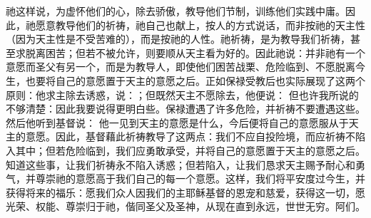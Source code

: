 祂这样说，为虚怀他们的心，除去骄傲，教导他们节制，训练他们实践中庸。因此，祂愿意教导他们的祈祷，祂自己也献上，按人的方式说话，而非按祂的天主性（因为天主性是不受苦难的），而是按祂的人性。祂祈祷，是为教导我们祈祷，甚至求脱离困苦；但若不被允许，则要顺从天主看为好的。因此祂说：并非祂有一个意愿而圣父有另一个，而是为教导人，即使他们困苦战栗、危险临到、不愿脱离今生，也要将自己的意愿置于天主的意愿之后。正如保禄受教后也实际展现了这两个原则：他求主除去诱惑，说：；但既然天主不愿除去，他便说： 但也许我所说的不够清楚：因此我要说得更明白些。保禄遭遇了许多危险，并祈祷不要遭遇这些。然后他听到基督说： 他一见到天主的意愿是什么，今后便将自己的意愿服从于天主的意愿。因此，基督藉此祈祷教导了这两点：我们不应自投险境，而应祈祷不陷入其中；但若危险临到，我们应勇敢承受，并将自己的意愿置于天主的意愿之后。知道这些事，让我们祈祷永不陷入诱惑；但若陷入，让我们恳求天主赐予耐心和勇气，并尊崇祂的意愿高于我们自己的每一个意愿。这样，我们将平安度过今生，并获得将来的福乐：愿我们众人因我们的主耶稣基督的恩宠和慈爱，获得这一切，愿光荣、权能、尊崇归于祂，偕同圣父及圣神，从现在直到永远，世世无穷。阿们。\par

